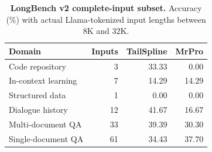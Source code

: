 \begin{table}[ht]
\centering\small
\caption{\textbf{LongBench v2 complete-input subset.} Accuracy (\%) with actual Llama-tokenized input lengths between $8$K and $32$K.}
\label{tab:longbench-new}
\begin{tabular}{@{}lrrr@{}}
\toprule
Domain & Inputs & TailSpline & MrPro \\
\midrule
Code repository & 3 & 33.33 & 0.00 \\
In-context learning & 7 & 14.29 & 14.29 \\
Structured data & 1 & 0.00 & 0.00 \\
Dialogue history & 12 & 41.67 & 16.67 \\
Multi-document QA & 33 & 39.39 & 30.30 \\
Single-document QA & 61 & 34.43 & 37.70 \\
\bottomrule
\end{tabular}
\end{table}
